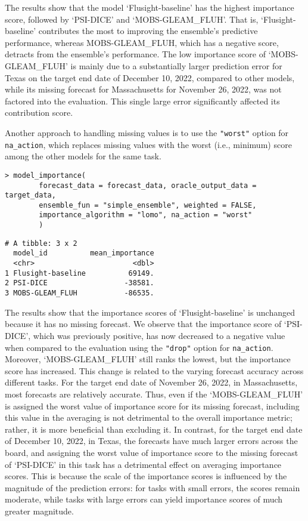 \documentclass[
  article,
  shortnames,
  notitle]{jss}
\begin{document}
\normalsize

The results show that the model `Flusight-baseline' has the highest
importance score, followed by `PSI-DICE' and `MOBS-GLEAM\_FLUH'. That
is, `Flusight-baseline' contributes the most to improving the ensemble's
predictive performance, whereas MOBS-GLEAM\_FLUH, which has a negative
score, detracts from the ensemble's performance. The low importance
score of `MOBS-GLEAM\_FLUH' is mainly due to a substantially larger
prediction error for Texas on the target end date of December 10, 2022,
compared to other models, while its missing forecast for Massachusetts
for November 26, 2022, was not factored into the evaluation. This single
large error significantly affected its contribution score.

Another approach to handling missing values is to use the
\texttt{"worst"} option for \texttt{na\_action}, which replaces missing
values with the worst (i.e., minimum) score among the other models for
the same task.

\begin{verbatim}
> model_importance(
        forecast_data = forecast_data, oracle_output_data = target_data,
        ensemble_fun = "simple_ensemble", weighted = FALSE,
        importance_algorithm = "lomo", na_action = "worst"
        )
\end{verbatim}

\small

\begin{verbatim}
# A tibble: 3 x 2
  model_id          mean_importance
  <chr>                       <dbl>
1 Flusight-baseline          69149.
2 PSI-DICE                  -38581.
3 MOBS-GLEAM_FLUH           -86535.
\end{verbatim}

\normalsize

The results show that the importance scores of `Flusight-baseline' is
unchanged because it has no missing forecast. We observe that the
importance score of `PSI-DICE', which was previously positive, has now
decreased to a negative value when compared to the evaluation using the
\texttt{"drop"} option for \texttt{na\_action}. Moreover,
`MOBS-GLEAM\_FLUH' still ranks the lowest, but the importance score has
increased. This change is related to the varying forecast accuracy
across different tasks. For the target end date of November 26, 2022, in
Massachusetts, most forecasts are relatively accurate. Thus, even if the
`MOBS-GLEAM\_FLUH' is assigned the worst value of importance score for
its missing forecast, including this value in the averaging is not
detrimental to the overall importance metric; rather, it is more
beneficial than excluding it. In contrast, for the target end date of
December 10, 2022, in Texas, the forecasts have much larger errors
across the board, and assigning the worst value of importance score to
the missing forecast of `PSI-DICE' in this task has a detrimental effect
on averaging importance scores. This is because the scale of the
importance scores is influenced by the magnitude of the prediction
errors: for tasks with small errors, the scores remain moderate, while
tasks with large errors can yield importance scores of much greater
magnitude.
\end{document}
